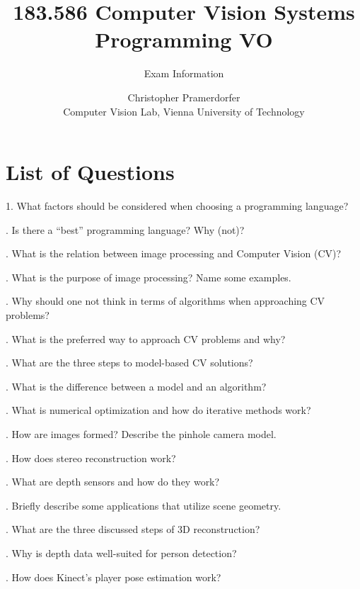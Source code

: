 \documentclass[paper=A4,11pt]{scrartcl}
\begin{document}
\title{\Large 183.586 Computer Vision Systems Programming VO}
\subtitle{Exam Information}
\author{Christopher Pramerdorfer\\\small Computer Vision Lab, Vienna University of Technology}
\maketitle

\section{List of Questions} %
\label{sec:list_of_questions}

1. What factors should be considered when choosing a programming language?

\bigskip{}. Is there a \enquote{best} programming language? Why (not)?

\bigskip{}. What is the relation between image processing and Computer Vision (CV)?

\bigskip{}. What is the purpose of image processing? Name some examples.

\bigskip{}. Why should one not think in terms of algorithms when approaching CV problems?

\bigskip{}. What is the preferred way to approach CV problems and why?

\bigskip{}. What are the three steps to model-based CV solutions?

\bigskip{}. What is the difference between a model and an algorithm?

\bigskip{}. What is numerical optimization and how do iterative methods work?

\bigskip{}. How are images formed? Describe the pinhole camera model.

\bigskip{}. How does stereo reconstruction work?

\bigskip{}. What are depth sensors and how do they work?

\bigskip{}. Briefly describe some applications that utilize scene geometry.

\bigskip{}. What are the three discussed steps of 3D reconstruction?

\bigskip{}. Why is depth data well-suited for person detection?

\bigskip{}. How does Kinect's player pose estimation work?
\end{document}

